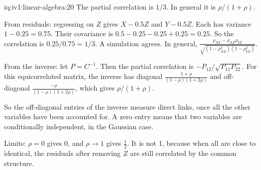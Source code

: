 \begin{solution}{iq:iv1:linear-algebra:20}
The partial correlation is $1/3$. In general it is $\rho/(1 + \rho)$.

From residuals: regressing on $Z$ gives $X - 0.5Z$ and $Y - 0.5Z$. Each has variance $1 - 0.25 = 0.75$. Their covariance is $0.5 - 0.25 - 0.25 + 0.25 = 0.25$. So the correlation is $0.25/0.75 = 1/3$. A simulation agrees. In general, $\frac{\rho_{XY} - \rho_{XZ}\rho_{YZ}}{\sqrt{(1 - \rho_{XZ}^2)(1 - \rho_{YZ}^2)}}$.

From the inverse: let $P = C^{-1}$. Then the partial correlation is $-P_{12}/\sqrt{P_{11}P_{22}}$. For this equicorrelated matrix, the inverse has diagonal $\frac{1 + \rho}{(1 - \rho)(1 + 2\rho)}$ and off-diagonal $\frac{-\rho}{(1 - \rho)(1 + 2\rho)}$, which gives $\rho/(1 + \rho)$.

So the off-diagonal entries of the inverse measure direct links, once all the other variables have been accounted for. A zero entry means that two variables are conditionally independent, in the Gaussian case.

Limits: $\rho = 0$ gives 0, and $\rho \to 1$ gives $\tfrac12$. It is not 1, because when all are close to identical, the residuals after removing $Z$ are still correlated by the common structure.

\end{solution}

